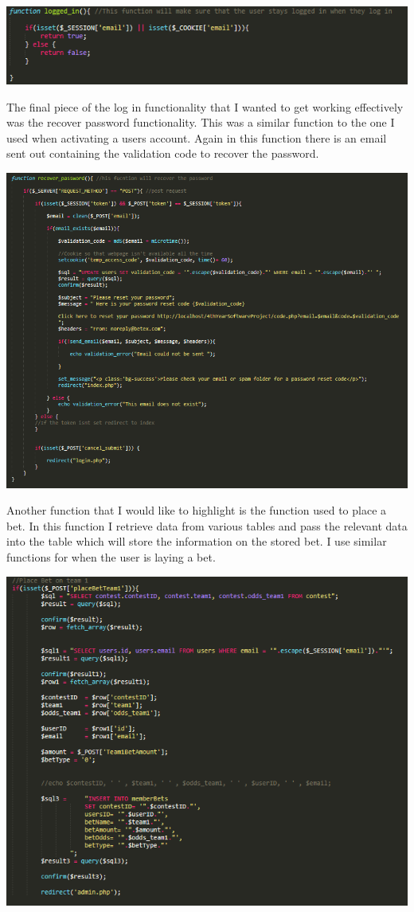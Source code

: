 \includegraphics[width=\textwidth,height=\textheight,keepaspectratio]{img/loggedIn.png}

The final piece of the log in functionality that I wanted to get working effectively was the recover password functionality. This was a similar function to the one I used when activating a users account. Again in this function there is an email sent out containing the validation code to recover the password.

\includegraphics[width=\textwidth,height=\textheight,keepaspectratio]{img/recover.png}

Another function that I would like to highlight is the function used to place a bet. In this function I retrieve data from various tables and pass the relevant data into the table which will store the information on the stored bet. I use similar functions for when the user is laying a bet. 

\includegraphics[width=\textwidth,height=\textheight,keepaspectratio]{img/placeBet.png}




